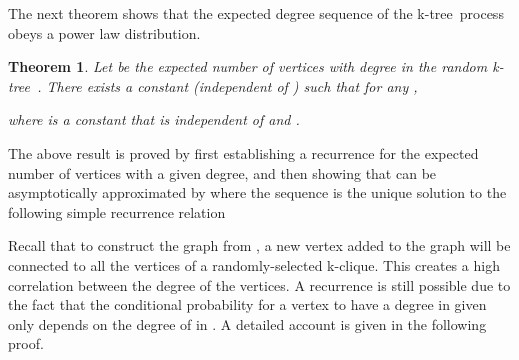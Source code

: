 \documentclass[11pt]{article}
\newtheorem{theorem}{Theorem}[section]
\providecommand{\ktree}{k-tree}
\begin{document}
The next theorem shows that the expected degree sequence of the \ktree\ process obeys a power law distribution.
\begin{theorem}
\label{theorem-average}
Let  be the expected number of vertices with degree  in the random \ktree\ . There exists a
constant  (independent of ) such that for any ,

where  is a constant that is independent of  and .
\end{theorem}

The above result is proved by first establishing a recurrence  
for the expected number  of vertices with a given degree, and then showing that 
 can be asymptotically approximated by  where
the sequence  is the unique solution to the following simple recurrence relation 


Recall that to construct the graph  from ,
a new vertex added to the graph  will be connected to all the vertices of
a randomly-selected k-clique. This creates a high correlation between the degree of the vertices.
A recurrence is still possible due to the fact that
the conditional probability for a vertex  to have
a degree  in  given  only depends on
the degree of  in . A detailed account is given in the following proof.
\end{document}
